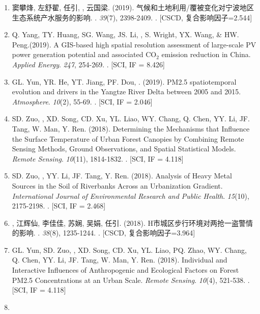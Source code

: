 \begin{enumerate}
\item
    窦攀烽, 左舒翟, 任引, {}, 云国梁. (2019).
    气候和土地利用/覆被变化对宁波地区生态系统产水服务的影响.
    {}. \textit{39}(7), 2398-2409.
    . [CSCD, 复合影响因子=2.544] 
\item
    Q. Yang, TY. Huang, SG. Wang, JS. Li, \Shaoqing, S. Wright, YX. Wang, \& HW. Peng.(2019).
    A GIS-based high spatial resolution assessment of large-scale PV power generation potential and associated CO$_2$ emission reduction in China.
    \textit{Applied Energy}. \textit{247}, 254-269.
    . [SCI, IF = 8.426]
\item
    GL. Yun, YR. He, YT. Jiang, PF. Dou, \Shaoqing. (2019).
    PM2.5 spatiotemporal evolution and drivers in the Yangtze River Delta between 2005 and 2015.
    \textit{Atmosphere}. \textit{10}(2), 55-69.
    . [SCI, IF = 2.046]
\item
    SD. Zuo, \Shaoqing, XD. Song, CD. Xu, YL. Liao, WY. Chang, Q. Chen, YY. Li, JF. Tang, W. Man, Y. Ren. (2018).
    Determining the Mechanisms that Influence the Surface Temperature of Urban Forest Canopies by Combining Remote Sensing Methods, Ground Observations, and Spatial Statistical Models. 
    \textit{Remote Sensing}. \textit{10}(11), 1814-1832.
    . [SCI, IF = 4.118]
\item
    SD. Zuo, \Shaoqing, YY. Li, JF. Tang, Y. Ren. (2018).
	Analysis of Heavy Metal Sources in the Soil of Riverbanks Across an Urbanization Gradient.
    \textit{International Journal of Environmental Research and Public Health}. \textit{15}(10), 2175-2198.
    . [SCI, IF = 2.468]
\item
    {}, 江辉仙, 李佳佳, 苏娴, 吴娟, 任引. (2018).
	H市城区步行环境对两抢一盗警情的影响.
    {}.  \textit{38}(8), 1235-1244.
    . [CSCD, 复合影响因子=3.964]
\item
    GL. Yun, SD. Zuo, \Shaoqing, XD. Song, CD. Xu, YL. Liao, PQ. Zhao, WY. Chang, Q. Chen, YY. Li, JF. Tang, W. Man, Y. Ren. (2018).
	Individual and Interactive Influences of Anthropogenic and Ecological Factors on Forest PM2.5 Concentrations at an Urban Scale.
    \textit{Remote Sensing}. \textit{10}(4), 521-538.
    . [SCI, IF = 4.118]
\item

\end{enumerate}
